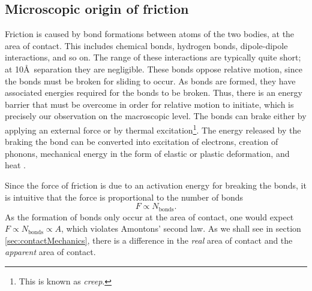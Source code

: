 \documentclass[twoside,english]{uiofysmaster}
\begin{document}
 
 \subsection{Microscopic origin of friction}
 Friction is caused by bond formations between atoms of the two bodies, at the area of contact. 
 This includes chemical bonds, hydrogen bonds, dipole-dipole interactions, and so on.  
 The range of these interactions are typically quite short; at 10\AA ~separation they are negligible.
 These bonds oppose relative motion, since the bonds must be broken for sliding to occur.
 As bonds are formed, they have associated energies required for the bonds to be broken. 
 Thus, there is an energy barrier that must be overcome in order for relative motion to initiate,
 which is precisely our observation on the macroscopic level. 
 The bonds can brake either by applying an external force or by thermal excitation\footnote{This is known as \textit{creep}.}.
 The energy released by the braking the bond can be converted into excitation of electrons, creation of phonons, mechanical energy in the form of elastic or plastic deformation, and heat \cite{Introduction2Friction}.
 
 Since the force of friction is due to an activation energy for breaking the bonds, it is intuitive that the force is proportional to the number of bonds
 \begin{equation}
 F \propto N_{\text{bonds}}.
 \end{equation} 
 As the formation of bonds only occur at the area of contact, one would expect $F\propto N_\text{bonds}\propto A$, which violates Amontons' second law. 
 As we shall see in section \ref{sec:contactMechanics}, there is a difference in the \textit{real} area of contact and the \textit{apparent} area of contact.
 
\end{document}
